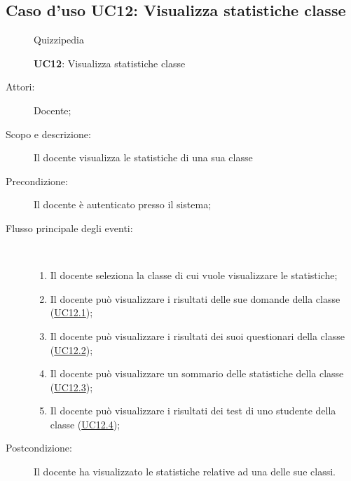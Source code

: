 \subsection{Caso d'uso UC12: Visualizza statistiche classe}
	\begin{figure}[H]
		\centering
		\begin{resizedtikzpicture}{\textwidth}
		\begin{umlsystem}[x=0, fill=lightgray!20]{Quizzipedia}
		\end{umlsystem}
		\end{resizedtikzpicture}
		\caption{\textbf{UC12}: Visualizza statistiche classe}
		\label{UC12}
	\end{figure}
\begin{description}
\item[Attori:] Docente;
\item[Scopo e descrizione:] Il docente visualizza le statistiche di una sua classe
      \item[Precondizione:] Il docente è autenticato presso il sistema;

        \item[Flusso principale degli eventi:] \ 
 \begin{enumerate}
          \item Il docente seleziona la classe di cui vuole visualizzare le statistiche;
          \item Il docente può visualizzare i risultati delle sue domande della classe (\hyperlink{UC12.1}{UC12.1});
          \item Il docente può visualizzare i risultati dei suoi questionari della classe (\hyperlink{UC12.2}{UC12.2});
          \item Il docente può visualizzare un sommario delle statistiche della classe (\hyperlink{UC12.3}{UC12.3});
          \item Il docente può visualizzare i risultati dei test di uno studente della classe (\hyperlink{UC12.4}{UC12.4});

      \end{enumerate}
    \item[Postcondizione:] Il docente ha visualizzato le statistiche relative ad una delle sue classi.
  \end{description}
\hypertarget{UC12.1}{}
